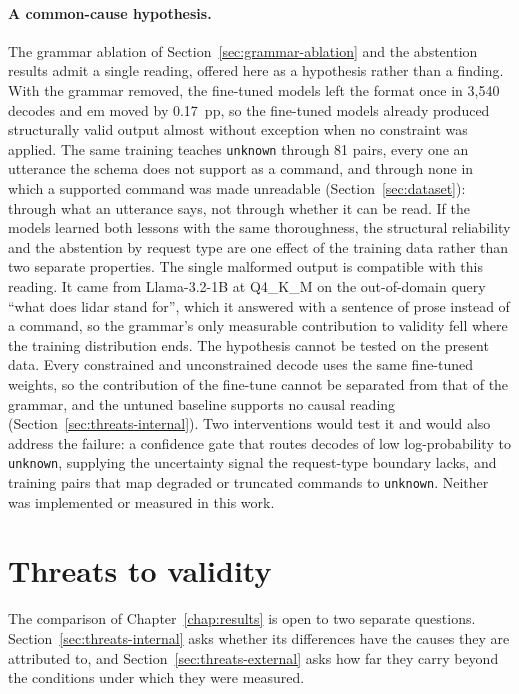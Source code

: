 \paragraph{A common-cause hypothesis.} The grammar ablation of Section~\ref{sec:grammar-ablation}
and the abstention results admit a single reading, offered here as a hypothesis rather than a
finding. With the grammar removed, the fine-tuned models left the format once in 3{,}540 decodes and
\gls{em} moved by 0.17~pp, so the fine-tuned models already produced structurally valid output almost
without exception when no constraint was applied. The same training teaches \texttt{unknown}
through 81 pairs, every one an utterance the schema does not support as a command, and through
none in which a supported command was made unreadable
(Section~\ref{sec:dataset}): through what an utterance says, not through whether it can be read.
If the models learned both lessons with the
same thoroughness, the structural reliability and the abstention by request type are one effect of the
training data rather than two separate properties. The single malformed output is compatible with
this reading. It came from Llama-3.2-1B at Q4\_K\_M on the out-of-domain query ``what does lidar
stand for'', which it answered with a sentence of prose instead of a command, so the grammar's only
measurable contribution to validity fell where the training distribution ends. The hypothesis cannot be tested
on the present data. Every constrained and unconstrained decode uses the same fine-tuned weights, so
the contribution of the fine-tune cannot be separated from that of the grammar, and the untuned
baseline supports no causal reading (Section~\ref{sec:threats-internal}). Two interventions would
test it and would also address the failure: a confidence gate that routes decodes of low
log-probability to \texttt{unknown}, supplying the uncertainty signal the request-type boundary lacks, and
training pairs that map degraded or truncated commands to \texttt{unknown}. Neither was implemented
or measured in this work.

\section{Threats to validity}
\label{sec:threats}

The comparison of Chapter~\ref{chap:results} is open to two separate questions.
Section~\ref{sec:threats-internal} asks whether its differences have the causes they are
attributed to, and Section~\ref{sec:threats-external} asks how far they carry beyond the
conditions under which they were measured.

